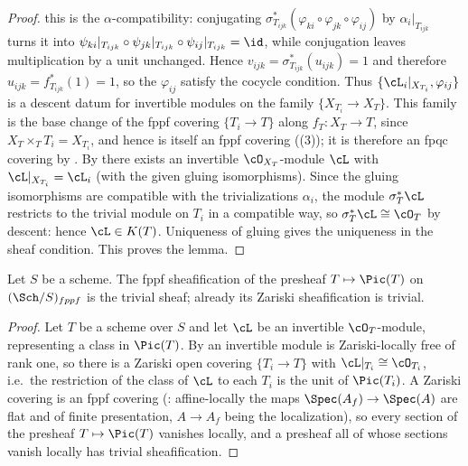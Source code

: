 \begin{proof}
this is the $\alpha$-compatibility: conjugating
$\sigma_{T_{ijk}}^*(\varphi_{ki}\circ\varphi_{jk}\circ\varphi_{ij})$ by
$\alpha_i|_{T_{ijk}}$ turns it into
$\psi_{ki}|_{T_{ijk}}\circ\psi_{jk}|_{T_{ijk}}\circ\psi_{ij}|_{T_{ijk}}
=\id$, while conjugation leaves multiplication by a unit unchanged.  Hence
$v_{ijk}=\sigma_{T_{ijk}}^*(u_{ijk})=1$ and therefore
$u_{ijk}=f_{T_{ijk}}^*(1)=1$, so the $\varphi_{ij}$ satisfy the cocycle
condition.  Thus $\{\cL_i|_{X_{T_i}},\varphi_{ij}\}$ is a descent datum
for invertible modules on the family $\{X_{T_i}\to X_T\}$.  This family is the
base change of the fppf covering $\{T_i\to T\}$ along $f_T:X_T\to T$, since
$X_T\times_TT_i=X_{T_i}$, and hence is itself an fppf covering
((3)); it is therefore an fpqc covering by
.  By
 there exists an invertible $\cO_{X_T}$-module
$\cL$ with $\cL|_{X_{T_i}}=\cL_i$ (with the given gluing isomorphisms).  Since the
gluing isomorphisms are compatible with the trivializations $\alpha_i$,
the module $\sigma_T^*\cL$ restricts to the trivial module on $T_i$ in a
compatible way, so $\sigma_T^*\cL\cong\cO_T$ by descent: hence
$\cL\in K(T)$.  Uniqueness of gluing gives the uniqueness in the sheaf
condition.  This proves the lemma.
\end{proof}

\begin{lemma}
\label{lem:pc-pic-base-sheafifies}
Let $S$ be a scheme.  The fppf sheafification of the presheaf
$T\mapsto\Pic(T)$ on $(\Sch/S)_{fppf}$ is the trivial sheaf; already
its Zariski sheafification is trivial.
\end{lemma}
\begin{proof}
Let $T$ be a scheme over $S$ and let $\cL$ be an invertible
$\cO_T$-module, representing a class in $\Pic(T)$.  By
 an invertible module is Zariski-locally
free of rank one, so there is a Zariski open covering
$\{T_i\to T\}$ with $\cL|_{T_i}\cong\cO_{T_i}$, i.e.\ the restriction
of the class of $\cL$ to each $T_i$ is the unit of $\Pic(T_i)$.  A
Zariski covering is an fppf covering
(: affine-locally the maps
$\Spec(A_f)\to\Spec(A)$ are flat and of finite presentation, $A\to A_f$
being the localization), so every section of the presheaf
$T\mapsto\Pic(T)$ vanishes locally, and a presheaf all of whose
sections vanish locally has trivial sheafification.
\end{proof}

